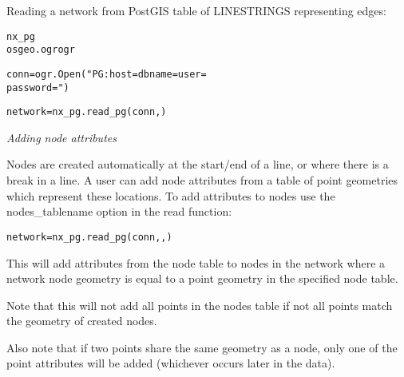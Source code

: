 Reading a network from PostGIS table of LINESTRINGS representing edges:

\begin{alltt}
\pysrcprompt{{\textgreater}{\textgreater}{\textgreater} } nx\_pg
\pysrcprompt{{\textgreater}{\textgreater}{\textgreater} } osgeo.ogr  ogr\end{alltt}
\begin{alltt}
\pysrcprompt{{\textgreater}{\textgreater}{\textgreater} }
\pysrcprompt{{\textgreater}{\textgreater}{\textgreater} }conn = ogr.Open("PG: host= dbname= user=
\pysrcprompt{{\textgreater}{\textgreater}{\textgreater} }                password=")\end{alltt}
\begin{alltt}
\pysrcprompt{{\textgreater}{\textgreater}{\textgreater} }
\pysrcprompt{{\textgreater}{\textgreater}{\textgreater} }\end{alltt}
\begin{alltt}
\pysrcprompt{{\textgreater}{\textgreater}{\textgreater} }network = nx\_pg.read\_pg(conn, )\end{alltt}
\textit{Adding node attributes}

Nodes are created automatically at the start/end of a line, or where there 
is a break in a line. A user can add node attributes from a table of point 
geometries which represent these locations. To add attributes to nodes use 
the nodes\_tablename option in the read function:

\begin{alltt}
\pysrcprompt{{\textgreater}{\textgreater}{\textgreater} }network = nx\_pg.read\_pg(conn, , )\end{alltt}
This will add attributes from the node table to nodes in the network where 
a network node geometry is equal to a point geometry in the specified node 
table.

Note that this will not add all points in the nodes table if not all points
match the geometry of created nodes.

Also note that if two points share the same geometry as a node, only one of
the point attributes will be added (whichever occurs later in the data).

